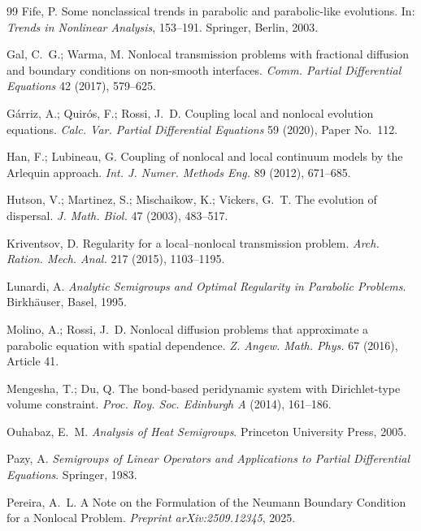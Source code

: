\documentclass[reqno]{amsart}
\numberwithin{equation}{section}
\begin{document}
\begin{thebibliography}{99}
Fife, P.
Some nonclassical trends in parabolic and parabolic-like evolutions.
In: \emph{Trends in Nonlinear Analysis}, 153--191.
Springer, Berlin, 2003.

Gal, C.~G.; Warma, M.
Nonlocal transmission problems with fractional diffusion and boundary conditions on non-smooth interfaces.
\emph{Comm. Partial Differential Equations} 42 (2017), 579--625.

G\'arriz, A.; Quir\'os, F.; Rossi, J.~D.
Coupling local and nonlocal evolution equations.
\emph{Calc. Var. Partial Differential Equations} 59 (2020), Paper No.~112.

Han, F.; Lubineau, G.
{Coupling of nonlocal and local continuum models by the Arlequin approach}.
\emph{Int. J. Numer. Methods Eng.} 89 (2012), 671--685.

Hutson, V.; Martinez, S.; Mischaikow, K.; Vickers, G.~T.
{The evolution of dispersal}.
\emph{J. Math. Biol.} 47 (2003), 483--517.

Kriventsov, D.
Regularity for a local--nonlocal transmission problem.
\emph{Arch. Ration. Mech. Anal.} 217 (2015), 1103--1195.

Lunardi, A.
\emph{Analytic Semigroups and Optimal Regularity in Parabolic Problems}.
Birkh\"auser, Basel, 1995.

Molino, A.; Rossi, J.~D.
Nonlocal diffusion problems that approximate a parabolic equation with spatial dependence.
\emph{Z. Angew. Math. Phys.} 67 (2016), Article 41.

Mengesha, T.; Du, Q.
{The bond-based peridynamic system with Dirichlet-type volume constraint}.
\emph{Proc. Roy. Soc. Edinburgh A} (2014), 161--186.


Ouhabaz, E.~M.
\emph{Analysis of Heat Semigroups}.
Princeton University Press, 2005.

Pazy, A.
\emph{Semigroups of Linear Operators and Applications to Partial Differential Equations}.
Springer, 1983.

Pereira, A.~L.
A Note on the Formulation of the Neumann Boundary Condition for a Nonlocal Problem.
\emph{Preprint arXiv:2509.12345}, 2025.


\end{thebibliography}
\end{document}
